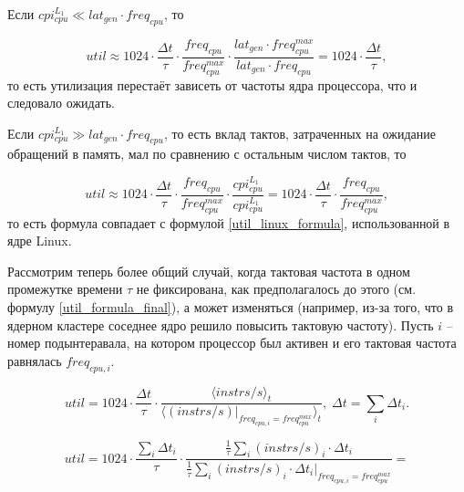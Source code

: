     Если $cpi_{cpu}^{L_1} \ll lat_{gen} \cdot freq_{cpu}$, то

    \begin{equation}
        util \approx 1024 \cdot \frac{\Delta t}{\tau} \cdot \frac{freq_{cpu}}{freq_{cpu}^{max}} \cdot
            \frac{lat_{gen} \cdot freq_{cpu}^{max}} {lat_{gen} \cdot freq_{cpu}} =
            1024 \cdot \frac{\Delta t}{\tau},
    \end{equation}
    то есть утилизация перестаёт зависеть от частоты ядра процессора,
    что и следовало ожидать.

    Если $cpi_{cpu}^{L_1} \gg lat_{gen} \cdot freq_{cpu}$, то есть вклад тактов, затраченных на ожидание
    обращений в память, мал по сравнению с остальным числом тактов, то

    \begin{equation}
        util \approx 1024 \cdot \frac{\Delta t}{\tau} \cdot \frac{freq_{cpu}}{freq_{cpu}^{max}} \cdot
            \frac{cpi_{cpu}^{L_1}} {cpi_{cpu}^{L_1}} = 1024 \cdot \frac{\Delta t}{\tau} \cdot
            \frac{freq_{cpu}}{freq_{cpu}^{max}},
    \end{equation}
    то есть формула совпадает с формулой \eqref{util_linux_formula}, использованной в ядре Linux.

    Рассмотрим теперь более общий случай, когда тактовая частота в одном промежутке времени $\tau$
    не фиксирована, как предполагалось до этого (см. формулу \eqref{util_formula_final}), а может
    изменяться (например, из-за того, что в ядерном кластере соседнее ядро решило повысить тактовую
    частоту). Пусть $i$ -- номер подынтеравала, на котором процессор был активен и его тактовая
    частота равнялась $freq_{cpu, i}$.

    \begin{equation}
        util = 1024 \cdot \frac{\Delta t}{\tau} \cdot
            \frac{\langle instrs / s \rangle_t }{ \langle (instrs / s) |_{freq_{cpu, i} = freq_{cpu}^{max}} \rangle_t},
            \; \Delta t = \sum \limits_i \Delta t_i.
    \end{equation}

    \begin{equation}
        util = 1024 \cdot \frac{\sum \limits_i \Delta t_i}{\tau} \cdot
            \frac{\frac{1}{\tau} \sum \limits_i (instrs / s)_i \cdot \Delta t_i}
                 {\frac{1}{\tau} \sum \limits_i (instrs / s)_i \cdot \Delta t_i |_{freq_{cpu, i} = freq_{cpu}^{max}}} =
    \end{equation}

